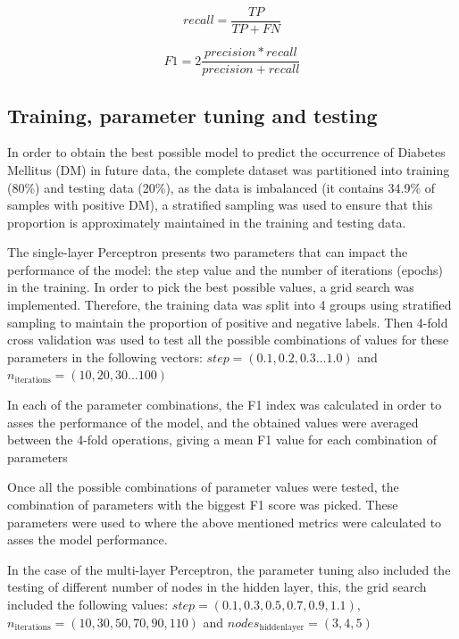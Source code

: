 \documentclass[10pt,twocolumn,letterpaper]{article}
\begin{document}
\begin{equation}
recall = \frac{TP}{TP+FN}
\end{equation}

\begin{equation}
F1 = 2 \frac{precision * recall}{precision + recall}
\end{equation}

\subsection{Training, parameter tuning and testing}

In order to obtain the best possible model to predict the occurrence of Diabetes Mellitus (DM) in future data, the complete dataset was partitioned into training (80\%) and testing data (20\%), as the data is imbalanced (it contains 34.9\% of samples with positive DM), a stratified sampling was used to ensure that this proportion is approximately maintained in the training and testing data. 

The single-layer Perceptron presents two parameters that can impact the performance of the model: the step value and the number of iterations (epochs) in the training. In order to pick the best possible values, a grid search was implemented. Therefore, the training data was split into 4 groups using stratified sampling to maintain the proportion of positive and negative labels. Then 4-fold cross validation was used to test all the possible combinations of values for these parameters in the following vectors: $step = (0.1,0.2,0.3...1.0)$ and $n_\mathrm{iterations} = (10,20,30...100)$

In each of the parameter combinations, the F1 index was calculated in order to asses the performance of the model, and the obtained values were averaged between the 4-fold operations, giving a mean F1 value for each combination of parameters

Once all the possible combinations of parameter values were tested, the combination of parameters with the biggest F1 score was picked. These parameters were used to  where the above mentioned metrics were calculated to asses the model performance.

In the case of the multi-layer Perceptron, the parameter tuning also included the testing of different number of nodes in the hidden layer, this, the grid search included the following values: $step = (0.1,0.3,0.5,0.7,0.9,1.1)$, $n_\mathrm{iterations} = (10,30,50,70,90,110)$ and $nodes_\mathrm{hidden layer} = (3,4,5)$
\end{document}
